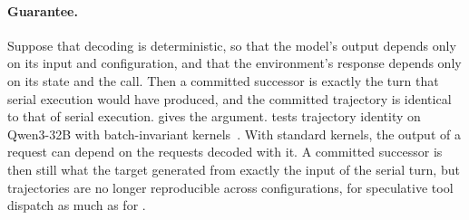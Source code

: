 \paragraph{Guarantee.}
Suppose that decoding is deterministic, so that the model's output depends only on its input and configuration, and that the environment's response depends only on its state and the call.
Then a committed successor is exactly the turn that serial execution would have produced, and the committed trajectory is identical to that of serial execution.
 gives the argument.
 tests trajectory identity on Qwen3-32B with batch-invariant kernels~\citep{he2025nondeterminism}.
With standard kernels, the output of a request can depend on the requests decoded with it.
A committed successor is then still what the target generated from exactly the input of the serial turn, but trajectories are no longer reproducible across configurations, for speculative tool dispatch as much as for \method.
